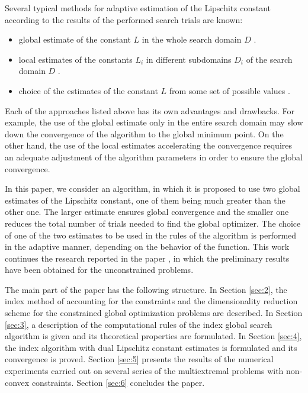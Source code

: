 \documentclass[twocolumn]{svjour3}          %
\begin{document}
		Several typical methods for adaptive estimation of the Lipschitz constant according to the results of the performed search trials are known:
\begin{itemize}
\item global estimate of the constant $L$ in the whole search domain $D$ \cite{Strongin2000,Pinter1996,Horst1996}.
\item local estimates of the constants $L_i$ in different subdomains $D_i$ of the search domain $D$ \cite{Kvasov2003,Sergeyev2010,Sergeyev2016}.
\item choice of the estimates of the constant $L$ from some set of possible values \cite{Jones2009,Jones1993,Gablonsky2001,Sergeyev2006}.
\end{itemize}

	Each of the approaches listed above has its own advantages and drawbacks. For example, the use of the global estimate only in the entire search domain may slow down the convergence of the algorithm to the global minimum point. On the other hand, the use of the local estimates accelerating the convergence requires an adequate adjustment of the algorithm parameters in order to ensure the global convergence. 

	In this paper, we consider an algorithm, in which it is proposed to use two global estimates of the Lipschitz constant, one of them being much greater than the other one. The larger estimate ensures global convergence and the smaller one reduces the total number of trials needed to find the global optimizer. The choice of one of the two estimates to be used in the rules of the algorithm is performed in the adaptive manner, depending on the behavior of the function. This work continues the research reported in the paper 
	\cite{NUMTA2019},
in which the preliminary results have been obtained for the unconstrained problems.
	
	The main part of the paper has the following structure. In Section \ref{sec:2}, the index method of accounting for the constraints and the dimensionality reduction scheme for the constrained global optimization problems are described. In Section \ref{sec:3}, a description of the computational rules of the index global search algorithm is given and its theoretical properties are formulated. In Section \ref{sec:4}, the index algorithm with dual Lipschitz constant estimates is formulated and its convergence is proved. Section \ref{sec:5} presents the results of the numerical experiments carried out on several series of the multiextremal problems with non-convex constraints. Section \ref{sec:6} concludes the paper.
\end{document}
